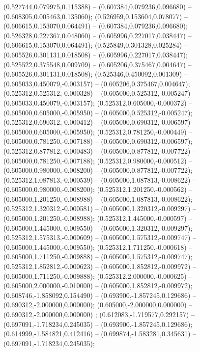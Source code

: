  (0.527744,0.079975,0.115388) -- (0.607384,0.079236,0.096680) -- (0.608305,0.005463,0.135060);
 (0.526959,0.153604,0.078077) -- (0.606615,0.153070,0.064491) -- (0.607384,0.079236,0.096680);
 (0.526328,0.227367,0.048060) -- (0.605996,0.227017,0.038447) -- (0.606615,0.153070,0.064491);
 (0.525849,0.301328,0.025284) -- (0.605526,0.301131,0.018508) -- (0.605996,0.227017,0.038447);
 (0.525522,0.375548,0.009709) -- (0.605206,0.375467,0.004647) -- (0.605526,0.301131,0.018508);
 (0.525346,0.450092,0.001309) -- (0.605033,0.450079,-0.003157) -- (0.605206,0.375467,0.004647);
 (0.525312,0.525312,-0.000328) -- (0.605000,0.525312,-0.005247) -- (0.605033,0.450079,-0.003157);
 (0.525312,0.605000,-0.000372) -- (0.605000,0.605000,-0.005950) -- (0.605000,0.525312,-0.005247);
 (0.525312,0.690312,-0.000412) -- (0.605000,0.690312,-0.006597) -- (0.605000,0.605000,-0.005950);
 (0.525312,0.781250,-0.000449) -- (0.605000,0.781250,-0.007188) -- (0.605000,0.690312,-0.006597);
 (0.525312,0.877812,-0.000483) -- (0.605000,0.877812,-0.007722) -- (0.605000,0.781250,-0.007188);
 (0.525312,0.980000,-0.000512) -- (0.605000,0.980000,-0.008200) -- (0.605000,0.877812,-0.007722);
 (0.525312,1.087813,-0.000539) -- (0.605000,1.087813,-0.008622) -- (0.605000,0.980000,-0.008200);
 (0.525312,1.201250,-0.000562) -- (0.605000,1.201250,-0.008988) -- (0.605000,1.087813,-0.008622);
 (0.525312,1.320312,-0.000581) -- (0.605000,1.320312,-0.009297) -- (0.605000,1.201250,-0.008988);
 (0.525312,1.445000,-0.000597) -- (0.605000,1.445000,-0.009550) -- (0.605000,1.320312,-0.009297);
 (0.525312,1.575313,-0.000609) -- (0.605000,1.575312,-0.009747) -- (0.605000,1.445000,-0.009550);
 (0.525312,1.711250,-0.000618) -- (0.605000,1.711250,-0.009888) -- (0.605000,1.575312,-0.009747);
 (0.525312,1.852812,-0.000623) -- (0.605000,1.852812,-0.009972) -- (0.605000,1.711250,-0.009888);
 (0.525312,2.000000,-0.000625) -- (0.605000,2.000000,-0.010000) -- (0.605000,1.852812,-0.009972);
 (0.608746,-1.858092,0.154490) -- (0.693900,-1.857245,0.129686) -- (0.690312,-2.000000,0.000000);
 (0.605000,-2.000000,0.000000) -- (0.690312,-2.000000,0.000000) ;
 (0.612083,-1.719577,0.292157) -- (0.697091,-1.718234,0.245035) -- (0.693900,-1.857245,0.129686);
 (0.614999,-1.584821,0.412416) -- (0.699874,-1.583281,0.345631) -- (0.697091,-1.718234,0.245035);
